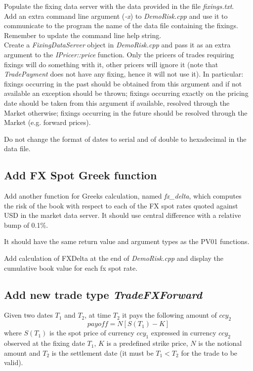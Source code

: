 \documentclass[10pt]{article}
\begin{document}
Populate the fixing data server with the data provided in the file \textit{fixings.txt}.\\

Add an extra command line argument (\textit{-x}) to \textit{DemoRisk.cpp} and use it to communicate to the program the name of the data file containing the fixings. Remember to update the command line help string.\\

Create a \textit{FixingDataServer} object in \textit{DemoRisk.cpp} and pass it as an extra argument to the \textit{IPricer::price} function. Only the pricers of trades requiring fixings will do something with it, other pricers will ignore it (note that \textit{TradePayment} does not have any fixing, hence it will not use it).
In particular: fixings occurring in the past should be obtained from this argument and if not available an exception should be thrown; fixings occurring exactly on the pricing date should be taken from this argument if available, resolved through the Market otherwise; fixings occurring in the future should be resolved through the Market (e.g. forward prices).

Do not change the format of dates to serial and of double to hexadecimal in the data file.

\subsection{Add FX Spot Greek function}
\label{sec:fxdelta}
Add another function for Greeks calculation, named \textit{fx\_delta}, which computes the risk of the book with respect to each of the FX spot rates quoted against USD in the market data server. It should use central difference with a relative bump of 0.1\%.

It should have the same return value and argument types as the PV01 functions.

Add calculation of FXDelta at the end of \textit{DemoRisk.cpp} and display the cumulative book value for each fx spot rate.

\subsection{Add new trade type \textit{TradeFXForward}}
Given two dates $T_1$ and $T_2$, at time $T_2$ it pays the following amount of $ccy_2$
$$
payoff=N[S(T_1)-K]
$$
where $S(T_1)$ is the spot price of currency $ccy_1$ expressed in currency $ccy_2$  observed at the fixing date $T_1$, $K$ is a predefined strike price, $N$ is the notional amount and $T_2$ is the settlement date (it must be $T_1<T_2$ for the trade to be valid).\\
\end{document}

